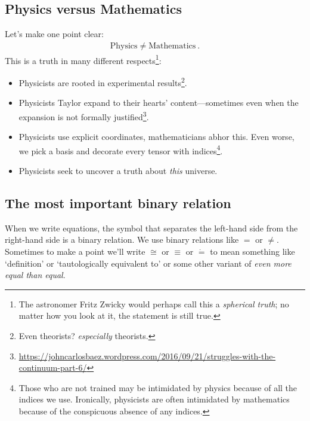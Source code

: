 
\subsection{Physics versus Mathematics}


Let’s make one point clear:
\begin{align}
  \text{Physics} \neq \text{Mathematics} \ .
\end{align}
This is a truth in many different respects\footnote{The astronomer Fritz Zwicky would perhaps call this a \emph{spherical truth}; no matter how you look at it, the statement is still true.}:
\begin{itemize}
	\item Physicists are rooted in experimental results\footnote{Even theorists? \emph{especially} theorists.}. 
	
	\item Physicists Taylor expand to their hearts’ content---sometimes even when the expansion is not formally justified\footnote{\url{https://johncarlosbaez.wordpress.com/2016/09/21/struggles-with-the-continuum-part-6/}}.

	\item Physicists use explicit coordinates, mathematicians abhor this.  Even worse, we pick a basis and decorate every tensor with indices\footnote{Those who are not trained may be intimidated by physics because of all the indices we use. Ironically, physicists are often intimidated by mathematics because of the conspicuous absence of any indices.}.

	\item Physicists seek to uncover a truth about \emph{this} universe.
\end{itemize}


\subsection{The most important binary relation}


When we write equations, the symbol that separates the left-hand side from the right-hand side is a binary relation. We use binary relations like $=$ or $\neq$. Sometimes to make a point we’ll write $\cong$ or $\equiv$ or $\dot =$ to mean something like `definition’ or `tautologically equivalent to’ or some other variant of \emph{even more equal than equal}. 

